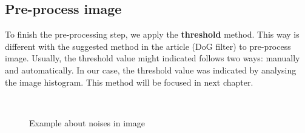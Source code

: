 \subsection{Pre-process image}
To finish the pre-processing step, we apply the \textbf{threshold} method. This way is different with the suggested method in the article\cite{palaniswamy2010automatic} (DoG filter) to pre-process image. Usually, the threshold value might indicated follows two ways: manually and automatically. In our case, the threshold value was indicated by analysing the image histogram. This method will be focused in next chapter.
\begin{figure}[h!]
\centering
{}~~
\caption{Example about noises in image}
\label{fig:figure_21}
\end{figure}
